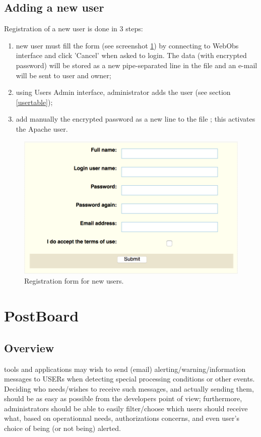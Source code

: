 \subsection{Adding a new user}

Registration of a new user is done in 3 steps:

\begin{enumerate}
\item new user must fill the form (see screenshot \ref{regform}) by connecting to WebObs interface and click 'Cancel' when asked to login. The data (with encrypted password) will be stored as a new pipe-separated line in the file  and an e-mail will be sent to user and \webobs owner;
\item using Users Admin interface, administrator adds the user (see section \ref{usertable});
\item add manually the encrypted password as a new line to the file ; this activates the Apache user.
\end{enumerate}


\begin{figure}
\center
\includegraphics[width=.5\textwidth]{figures/registration_form.png}
\caption{Registration form for new users.}
\label{regform}
\end{figure}


\section{PostBoard}

\subsection{Overview}

\webobs tools and applications may wish to send (email) alerting/warning/information messages to \webobs USERs when detecting 
special processing conditions or other events. Deciding who needs/wishes to receive such messages, and actually sending them, should be
as easy as possible from the developers point of view; furthermore, \webobs administrators should be able to easily filter/choose which users 
should receive what, based on operationnal needs, authorizations concerns, and even user's choice of being (or not being) alerted.

